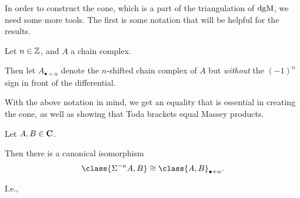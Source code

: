 In order to construct the cone, which is a part of the triangulation of \( \operatorname{dgM} \), we need some more tools. The first is some notation that will be helpful for the results.

\begin{notation}
    Let \( n \in {\mathbb{Z}} \), and \( A \) a chain complex.
    
    Then let \( A_{\bullet+n} \) denote the \( n \)-shifted chain complex of \( A \) but \emph{without} the \( (-1)^n \) sign in front of the differential.
\end{notation}

With the above notation in mind, we get an equality that is essential in creating the cone, as well as showing that Toda brackets equal Massey products.

\begin{lemma}
    \label{lem:shift_one_component_inner_product_chain_complex}
    Let \( A, B \in \operatorname{\mathbf{C}} \).

    Then there is a canonical isomorphism
    \[
        \class{\Sigma^{-n} A, B} \cong \class{A, B}_{\bullet+n}.
    \]

    I.e.,
    \begin{center}
    \end{center}
\end{lemma}
